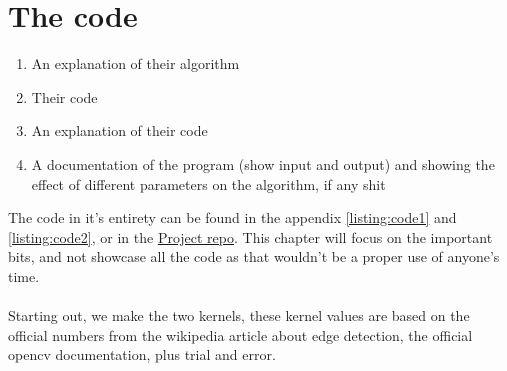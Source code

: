 \chapter{The code}
	\begin{enumerate}
		\item An explanation of their algorithm
		\item Their code
		\item An explanation of their code
		\item A documentation of the program (show input and output) and showing the effect of different parameters on the algorithm, if any shit\\
	\end{enumerate}

	The code in it's entirety can be found in the appendix \autoref{listing:code1} and \autoref{listing:code2}, or in the \href{https://github.com/totalfreak/opencvFilters}{\color{blue}Project repo}. This chapter will focus on the important bits, and not showcase all the code as that wouldn't be a proper use of anyone's time.\\
	\\
	Starting out, we make the two kernels, these kernel values are based on the official numbers from the wikipedia article about edge detection, the official opencv documentation, plus trial and error.

